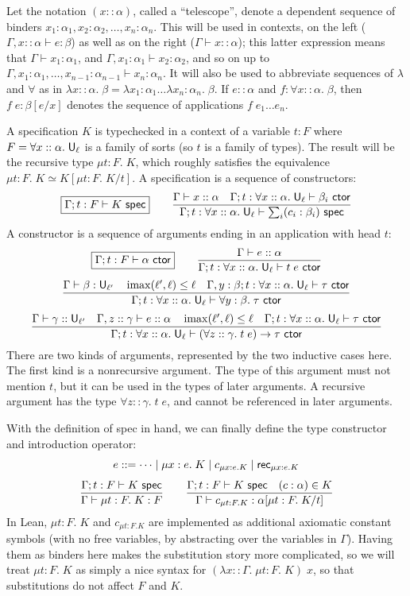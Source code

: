 Let the notation $(x :: \alpha)$, called a ``telescope'', denote a dependent sequence of binders $x_1:\alpha_1, x_2:\alpha_2,\dots, x_n:\alpha_n$. This will be used in contexts, on the left ($\Gamma,x::\alpha\vdash e:\beta$) as well as on the right ($\Gamma\vdash x::\alpha$); this latter expression means that $\Gamma\vdash x_1:\alpha_1$, and $\Gamma,x_1:\alpha_1\vdash x_2:\alpha_2$, and so on up to\\
$\Gamma,x_1:\alpha_1,\dots,x_{n-1}:\alpha_{n-1}\vdash x_n:\alpha_n$. It will also be used to abbreviate sequences of $\lambda$ and $\forall$ as in $\lambda x::\alpha.\;\beta=\lambda x_1:\alpha_1\dots\lambda x_n:\alpha_n.\;\beta$. If $e::\alpha$ and $f:\forall x::\alpha.\;\beta$, then $f\;e:\beta[e/x]$ denotes the sequence of applications $f\;e_1\dots e_n$.

A specification $K$ is typechecked in a context of a variable $t:F$ where $F=\forall x::\alpha.\;\mathsf{U}_\ell$ is a family of sorts (so $t$ is a family of types). The result will be the recursive type $\mu t:F.\;K$, which roughly satisfies the equivalence $\mu t:F.\;K\simeq K[\mu t:F.\;K/t]$. A specification is a sequence of constructors:
$$\boxed{\Gamma;t:F\vdash K\spec} \qquad
\frac{\Gamma\vdash x::\alpha\quad \Gamma;t:\forall x::\alpha.\;\U_\ell\vdash \beta_i\ctor}{\Gamma;t:\forall x::\alpha.\;\U_\ell\vdash \sum_i(c_i:\beta_i)\spec}$$
A constructor is a sequence of arguments ending in an application with head $t$:
$$\boxed{\Gamma;t:F\vdash \alpha\ctor} \qquad
\frac{\Gamma\vdash e::\alpha}{\Gamma;t:\forall x::\alpha.\;\U_\ell\vdash t\;e\ctor}$$
$$\frac{\Gamma\vdash \beta:\U_{\ell'}\quad \imax(\ell',\ell)\le\ell\quad \Gamma,y:\beta;t:\forall x::\alpha.\;\U_\ell\vdash\tau\ctor}{\Gamma;t:\forall x::\alpha.\;\U_\ell\vdash\forall y:\beta.\;\tau\ctor}$$
$$\frac{\Gamma\vdash \gamma::\U_{\ell'}\quad \Gamma,z::\gamma\vdash e::\alpha \quad
\imax(\ell',\ell)\le\ell\quad \Gamma;t:\forall x::\alpha.\;\U_\ell\vdash\tau\ctor}{\Gamma;t:\forall x::\alpha.\;\U_\ell\vdash(\forall z::\gamma.\;t\;e)\to\tau\ctor}$$
There are two kinds of arguments, represented by the two inductive cases here. The first kind is a nonrecursive argument. The type of this argument must not mention $t$, but it can be used in the types of later arguments. A recursive argument has the type $\forall z::\gamma.\;t\;e$, and cannot be referenced in later arguments.

With the definition of \textsf{spec} in hand, we can finally define the type constructor and introduction operator:
%
$$e::=\dots\mid\mu x:e.\;K\mid c_{\mu x:e.K}\mid\mathsf{rec}_{\mu x:e.K}$$
$$\frac{\Gamma;t:F\vdash K\spec}{\Gamma\vdash \mu t:F.\;K:F}\qquad
\frac{\Gamma;t:F\vdash K\spec\quad (c:\alpha)\in K}{\Gamma\vdash c_{\mu t:F.K}:\alpha[\mu t:F.\;K/t]}$$
In Lean, $\mu t:F.\;K$ and $c_{\mu t:F.K}$ are implemented as additional axiomatic constant symbols (with no free variables, by abstracting over the variables in $\Gamma$). Having them as binders here makes the substitution story more complicated, so we will treat $\mu t:F.\;K$ as simply a nice syntax for $(\lambda x::\Gamma.\;\mu t:F.\;K)\;x$, so that substitutions do not affect $F$ and $K$.

